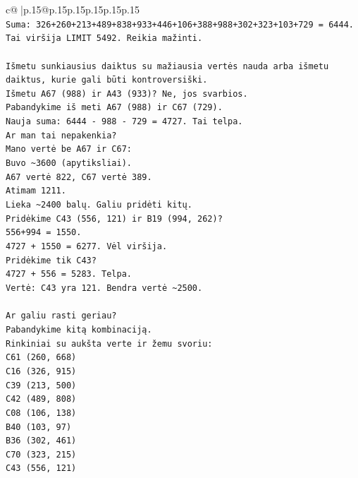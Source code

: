 \documentclass{article}
\begin{document}
{\begin{supertabular}{c@{$\;$}|p{.15\linewidth}@{}p{.15\linewidth}p{.15\linewidth}p{.15\linewidth}p{.15\linewidth}p{.15\linewidth}}
{{{\\ 
\texttt{Suma: 326+260+213+489+838+933+446+106+388+988+302+323+103+729 = 6444. Tai viršija LIMIT 5492. Reikia mažinti.} \\
\\ 
\texttt{Išmetu sunkiausius daiktus su mažiausia vertės nauda arba išmetu daiktus, kurie gali būti kontroversiški.} \\
\texttt{Išmetu A67 (988) ir A43 (933)? Ne, jos svarbios.} \\
\texttt{Pabandykime iš meti A67 (988) ir C67 (729).} \\
\texttt{Nauja suma: 6444 {-} 988 {-} 729 = 4727. Tai telpa.} \\
\texttt{Ar man tai nepakenkia?} \\
\texttt{Mano vertė be A67 ir C67:} \\
\texttt{Buvo \textasciitilde{}3600 (apytiksliai).} \\
\texttt{A67 vertė 822, C67 vertė 389.} \\
\texttt{Atimam 1211.} \\
\texttt{Lieka \textasciitilde{}2400 balų. Galiu pridėti kitų.} \\
\texttt{Pridėkime C43 (556, 121) ir B19 (994, 262)?} \\
\texttt{556+994 = 1550.} \\
\texttt{4727 + 1550 = 6277. Vėl viršija.} \\
\texttt{Pridėkime tik C43?} \\
\texttt{4727 + 556 = 5283. Telpa.} \\
\texttt{Vertė: C43 yra 121. Bendra vertė \textasciitilde{}2500.} \\
\\ 
\texttt{Ar galiu rasti geriau?} \\
\texttt{Pabandykime kitą kombinaciją.} \\
\texttt{Rinkiniai su aukšta verte ir žemu svoriu:} \\
\texttt{C61 (260, 668)} \\
\texttt{C16 (326, 915)} \\
\texttt{C39 (213, 500)} \\
\texttt{C42 (489, 808)} \\
\texttt{C08 (106, 138)} \\
\texttt{B40 (103, 97)} \\
\texttt{B36 (302, 461)} \\
\texttt{C70 (323, 215)} \\
\texttt{C43 (556, 121)} \\
}}}
\end{supertabular}}
\end{document}
